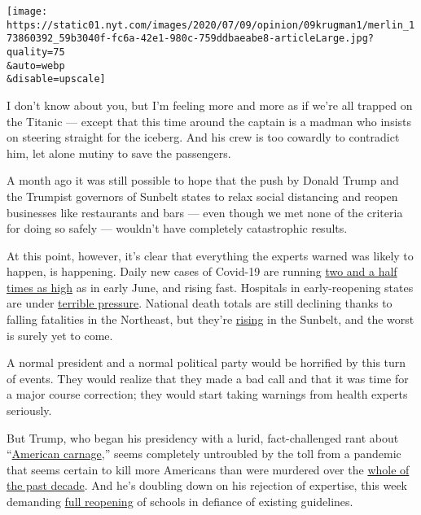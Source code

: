 \texttt{[image: https://static01.nyt.com/images/2020/07/09/opinion/09krugman1/merlin\_173860392\_59b3040f-fc6a-42e1-980c-759ddbaeabe8-articleLarge.jpg?quality=75\\\&auto=webp\\\&disable=upscale]}

I don't know about you, but I'm feeling more and more as if we're all
trapped on the Titanic --- except that this time around the captain is a
madman who insists on steering straight for the iceberg. And his crew is
too cowardly to contradict him, let alone mutiny to save the passengers.

A month ago it was still possible to hope that the push by Donald Trump
and the Trumpist governors of Sunbelt states to relax social distancing
and reopen businesses like restaurants and bars --- even though we met
none of the criteria for doing so safely --- wouldn't have completely
catastrophic results.

At this point, however, it's clear that everything the experts warned
was likely to happen, is happening. Daily new cases of Covid-19 are
running
\href{https://www.nytimes.com/interactive/2020/us/coronavirus-us-cases.html?action=click\&module=Top\%20Stories\&pgtype=Homepage}{two
and a half times as high} as in early June, and rising fast. Hospitals
in early-reopening states are under
\href{https://www.washingtonpost.com/politics/surge-in-virus-hospitalizations-strains-hospitals-in-several-states/2020/07/08/12855e5e-c135-11ea-864a-0dd31b9d6917_story.html}{terrible
pressure}. National death totals are still declining thanks to falling
fatalities in the Northeast, but they're
\href{https://twitter.com/COVID19Tracking/status/1281011411901177858}{rising}
in the Sunbelt, and the worst is surely yet to come.

A normal president and a normal political party would be horrified by
this turn of events. They would realize that they made a bad call and
that it was time for a major course correction; they would start taking
warnings from health experts seriously.

But Trump, who began his presidency with a lurid, fact-challenged rant
about
``\href{https://www.nytimes.com/interactive/projects/cp/opinion/presidential-inauguration-2017/trump-gives-us-american-carnage}{American
carnage},'' seems completely untroubled by the toll from a pandemic that
seems certain to kill more Americans than were murdered over the
\href{http://www.disastercenter.com/crime/uscrime.htm}{whole of the past
decade}. And he's doubling down on his rejection of expertise, this week
demanding
\href{https://www.nytimes.com/2020/07/08/us/politics/trump-schools-reopening.html?action=click\&module=Well\&pgtype=Homepage\&section=Politics}{full
reopening} of schools in defiance of existing guidelines.

